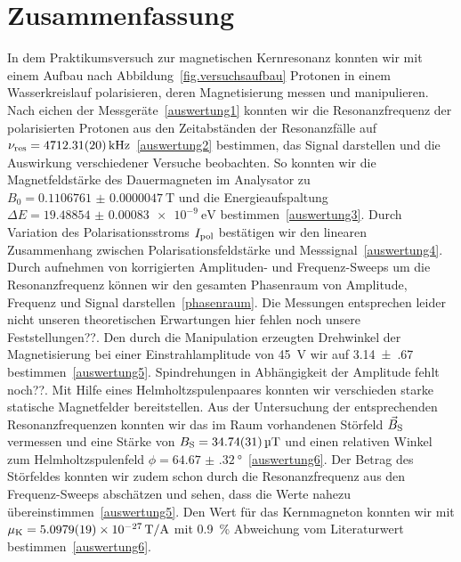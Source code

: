 \documentclass[paper=a4,
	fontsize=10pt,
	DIV=18,
	twocolumn,
	parskip=half
	]{scrartcl}
\numberwithin{equation}{section}    %
\newcommand{\note}[1]{{\color{red}#1??}}
\begin{document}


%
\section{Zusammenfassung}
%
In dem Praktikumsversuch zur magnetischen Kernresonanz konnten wir mit einem Aufbau nach Abbildung~\ref{fig.versuchsaufbau} Protonen in einem Wasserkreislauf polarisieren, deren Magnetisierung messen und manipulieren.
Nach eichen der Messgeräte~\ref{auswertung1} konnten wir die Resonanzfrequenz der polarisierten Protonen aus den Zeitabständen der Resonanzfälle auf $\nu_{\rm res} = \SI{4712.31(20)}{\kilo\hertz}$~\ref{auswertung2} bestimmen, das Signal darstellen und die Auswirkung verschiedener Versuche beobachten.
So konnten wir die Magnetfeldstärke des Dauermagneten im Analysator zu $B_0 = \SI[separate-uncertainty=false]{0.1106761(47)}{\tesla}$ und die Energieaufspaltung $\Delta E = \SI[separate-uncertainty=false]{19.48854(83)e-9}{\electronvolt}$ bestimmen~\ref{auswertung3}. Durch Variation des Polarisationsstroms $I_{\rm pol}$ bestätigen wir den linearen Zusammenhang zwischen Polarisationsfeldstärke und Messsignal~\ref{auswertung4}.
Durch aufnehmen von korrigierten Amplituden- und Frequenz-Sweeps um die Resonanzfrequenz können wir den gesamten Phasenraum von Amplitude, Frequenz und Signal darstellen~\ref{phasenraum}. Die Messungen entsprechen leider nicht unseren theoretischen Erwartungen \note{hier fehlen noch unsere Feststellungen}. Den durch die Manipulation erzeugten Drehwinkel der Magnetisierung bei einer Einstrahlamplitude von \SI{45}{\volt} wir auf \SI{3.14(67)}{} bestimmen~\ref{auswertung5}. \note{Spindrehungen in Abhängigkeit der Amplitude fehlt noch}. Mit Hilfe eines Helmholtzspulenpaares konnten wir verschieden starke statische Magnetfelder bereitstellen. Aus der Untersuchung der entsprechenden Resonanzfrequenzen konnten wir das im Raum vorhandenen Störfeld $\vec{B}_{\rm S}$ vermessen und eine Stärke von $B_{\rm S} = \SI{34.74(31)}{\micro\tesla}$ und einen relativen Winkel zum Helmholtzspulenfeld $\phi = \SI{64.67(32)}{\degree}$~\ref{auswertung6}. Der Betrag des Störfeldes konnten wir zudem schon durch die Resonanzfrequenz aus den Frequenz-Sweeps abschätzen und sehen, dass die Werte nahezu übereinstimmen~\ref{auswertung5}. Den Wert für das Kernmagneton konnten wir mit $\mu_{\rm K} = \SI[separate-uncertainty=false, per-mode=symbol]{5.0979(19)e-27}{\tesla\per\ampere}$ mit \SI{0.9}{\percent} Abweichung vom Literaturwert bestimmen~\ref{auswertung6}.
\end{document}
